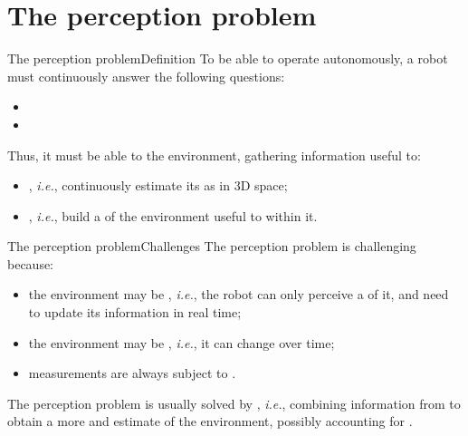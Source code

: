 
\section{The perception problem}
\graphicspath{{figs/section1/}}

\begin{frame}{The perception problem}{Definition}
  To be able to operate autonomously, a robot must continuously answer the following questions:
  \begin{itemize}
    \item {}
    \item {}
  \end{itemize}
  \medskip
  Thus, it must be able to  the environment, gathering information useful to:
  \begin{itemize}
    \item {}, \emph{i.e.}, continuously estimate its  as  in 3D space;
    \item {}, \emph{i.e.}, build a  of the environment useful to  within it.
  \end{itemize}
\end{frame}
\begin{frame}{The perception problem}{Challenges}
  The perception problem is challenging because:
  \begin{itemize}
    \item the environment may be , \emph{i.e.}, the robot can only perceive a  of it, and need to update its information in real time;
    \item the environment may be , \emph{i.e.}, it can change over time;
    \item measurements are always subject to .
  \end{itemize}
  \medskip
  The perception problem is usually solved by , \emph{i.e.}, combining information from  to obtain a more  and  estimate of the environment, possibly accounting for .
\end{frame}
